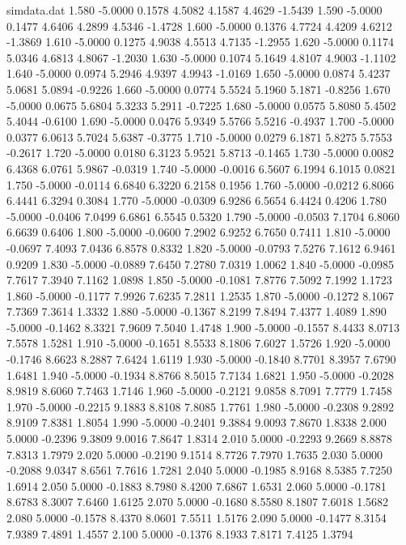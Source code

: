 \begin{filecontents*}{simdata.dat}
1.580 -5.0000 0.1578 4.5082 4.1587 4.4629 -1.5439
1.590 -5.0000 0.1477 4.6406 4.2899 4.5346 -1.4728
1.600 -5.0000 0.1376 4.7724 4.4209 4.6212 -1.3869
1.610 -5.0000 0.1275 4.9038 4.5513 4.7135 -1.2955
1.620 -5.0000 0.1174 5.0346 4.6813 4.8067 -1.2030
1.630 -5.0000 0.1074 5.1649 4.8107 4.9003 -1.1102
1.640 -5.0000 0.0974 5.2946 4.9397 4.9943 -1.0169
1.650 -5.0000 0.0874 5.4237 5.0681 5.0894 -0.9226
1.660 -5.0000 0.0774 5.5524 5.1960 5.1871 -0.8256
1.670 -5.0000 0.0675 5.6804 5.3233 5.2911 -0.7225
1.680 -5.0000 0.0575 5.8080 5.4502 5.4044 -0.6100
1.690 -5.0000 0.0476 5.9349 5.5766 5.5216 -0.4937
1.700 -5.0000 0.0377 6.0613 5.7024 5.6387 -0.3775
1.710 -5.0000 0.0279 6.1871 5.8275 5.7553 -0.2617
1.720 -5.0000 0.0180 6.3123 5.9521 5.8713 -0.1465
1.730 -5.0000 0.0082 6.4368 6.0761 5.9867 -0.0319
1.740 -5.0000 -0.0016 6.5607 6.1994 6.1015 0.0821
1.750 -5.0000 -0.0114 6.6840 6.3220 6.2158 0.1956
1.760 -5.0000 -0.0212 6.8066 6.4441 6.3294 0.3084
1.770 -5.0000 -0.0309 6.9286 6.5654 6.4424 0.4206
1.780 -5.0000 -0.0406 7.0499 6.6861 6.5545 0.5320
1.790 -5.0000 -0.0503 7.1704 6.8060 6.6639 0.6406
1.800 -5.0000 -0.0600 7.2902 6.9252 6.7650 0.7411
1.810 -5.0000 -0.0697 7.4093 7.0436 6.8578 0.8332
1.820 -5.0000 -0.0793 7.5276 7.1612 6.9461 0.9209
1.830 -5.0000 -0.0889 7.6450 7.2780 7.0319 1.0062
1.840 -5.0000 -0.0985 7.7617 7.3940 7.1162 1.0898
1.850 -5.0000 -0.1081 7.8776 7.5092 7.1992 1.1723
1.860 -5.0000 -0.1177 7.9926 7.6235 7.2811 1.2535
1.870 -5.0000 -0.1272 8.1067 7.7369 7.3614 1.3332
1.880 -5.0000 -0.1367 8.2199 7.8494 7.4377 1.4089
1.890 -5.0000 -0.1462 8.3321 7.9609 7.5040 1.4748
1.900 -5.0000 -0.1557 8.4433 8.0713 7.5578 1.5281
1.910 -5.0000 -0.1651 8.5533 8.1806 7.6027 1.5726
1.920 -5.0000 -0.1746 8.6623 8.2887 7.6424 1.6119
1.930 -5.0000 -0.1840 8.7701 8.3957 7.6790 1.6481
1.940 -5.0000 -0.1934 8.8766 8.5015 7.7134 1.6821
1.950 -5.0000 -0.2028 8.9819 8.6060 7.7463 1.7146
1.960 -5.0000 -0.2121 9.0858 8.7091 7.7779 1.7458
1.970 -5.0000 -0.2215 9.1883 8.8108 7.8085 1.7761
1.980 -5.0000 -0.2308 9.2892 8.9109 7.8381 1.8054
1.990 -5.0000 -0.2401 9.3884 9.0093 7.8670 1.8338
2.000 5.0000 -0.2396 9.3809 9.0016 7.8647 1.8314
2.010 5.0000 -0.2293 9.2669 8.8878 7.8313 1.7979
2.020 5.0000 -0.2190 9.1514 8.7726 7.7970 1.7635
2.030 5.0000 -0.2088 9.0347 8.6561 7.7616 1.7281
2.040 5.0000 -0.1985 8.9168 8.5385 7.7250 1.6914
2.050 5.0000 -0.1883 8.7980 8.4200 7.6867 1.6531
2.060 5.0000 -0.1781 8.6783 8.3007 7.6460 1.6125
2.070 5.0000 -0.1680 8.5580 8.1807 7.6018 1.5682
2.080 5.0000 -0.1578 8.4370 8.0601 7.5511 1.5176
2.090 5.0000 -0.1477 8.3154 7.9389 7.4891 1.4557
2.100 5.0000 -0.1376 8.1933 7.8171 7.4125 1.3794

\end{filecontents*}
